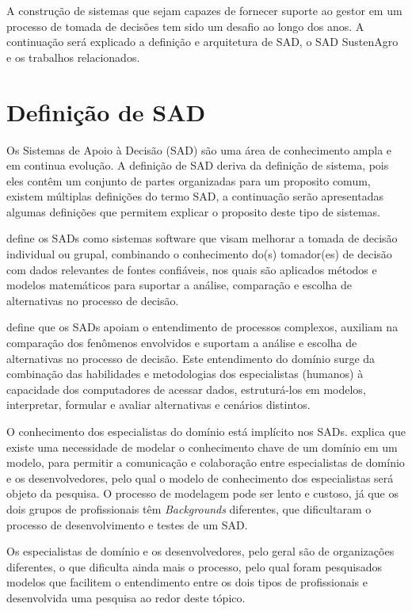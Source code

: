 A construção de sistemas que sejam capazes de fornecer suporte ao
gestor em um processo de tomada de decisões tem sido um desafio ao
longo dos anos. A continuação será explicado a definição e arquitetura
de SAD, o SAD SustenAgro e os trabalhos relacionados.

\section{Definição de SAD}

Os Sistemas de Apoio à Decisão (SAD) são uma área de conhecimento
ampla e em continua evolução. A definição de SAD deriva da definição
de sistema, pois eles contêm um conjunto de partes organizadas para
um proposito comum, existem múltiplas definições do termo SAD, a continuação
serão apresentadas algumas definições que permitem explicar o proposito
deste tipo de sistemas.

\citet{Tweedale2016} define os SADs como sistemas software que visam
melhorar a tomada de decisão individual ou grupal, combinando o conhecimento
do(s) tomador(es) de decisão com dados relevantes de fontes confiáveis,
nos quais são aplicados métodos e modelos matemáticos para suportar
a análise, comparação e escolha de alternativas no processo de decisão.

\citet{heinzle2010semantica} define que os SADs apoiam o entendimento
de processos complexos, auxiliam na comparação dos fenômenos envolvidos
e suportam a análise e escolha de alternativas no processo de decisão.
Este entendimento do domínio surge da combinação das habilidades e
metodologias dos especialistas (humanos) à capacidade dos computadores
de acessar dados, estruturá-los em modelos, interpretar, formular
e avaliar alternativas e cenários distintos.

O conhecimento dos especialistas do domínio está implícito nos SADs.
\citet{Evans:2003:DDT:861502} explica que existe uma necessidade
de modelar o conhecimento chave de um domínio em um modelo, para permitir
a comunicação e colaboração entre especialistas de domínio e os desenvolvedores,
pelo qual o modelo de conhecimento dos especialistas será objeto da
pesquisa. O processo de modelagem pode ser lento e custoso, já que
os dois grupos de profissionais têm \foreignlanguage{english}{\emph{Backgrounds}}
diferentes, que dificultaram o processo de desenvolvimento e testes
de um SAD.

Os especialistas de domínio e os desenvolvedores, pelo geral são de
organizações diferentes, o que dificulta ainda mais o processo, pelo
qual foram pesquisados modelos que facilitem o entendimento entre
os dois tipos de profissionais e desenvolvida uma pesquisa ao redor
deste tópico.

